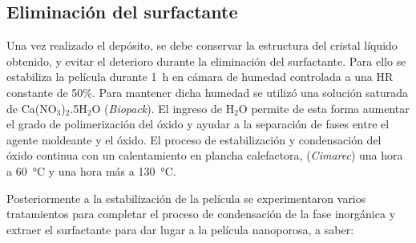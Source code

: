 	\subsection{Eliminación del surfactante}\label{sec:cond_y_extr}

		Una vez realizado el depósito, se debe conservar la estructura del cristal líquido obtenido, y evitar el deterioro durante la eliminación del surfactante. Para ello se estabiliza la película durante \SI{1}{\hour} en cámara de humedad controlada a una HR constante de 50\%. Para mantener dicha humedad se utilizó una solución saturada de Ca(NO$_3$)$_2$.5H$_2$O (\textit{Biopack}). El ingreso de H$_2$O permite de esta forma aumentar el grado de polimerización del óxido y ayudar a la separación de fases entre el agente moldeante y el óxido\cite{Crepaldi2003}. El proceso de estabilización y condensación del óxido continua con un calentamiento en plancha calefactora, (\textit{Cimarec}) una hora a \SI{60}{\celsius} y una hora más a \SI{130}{\celsius}\cite{Crepaldi2003,Crepaldi2002a}. 
				
		Posteriormente a la estabilización de la película se experimentaron varios tratamientos para completar el proceso de condensación de la fase inorgánica y extraer el surfactante para dar lugar a la película nanoporosa, a saber:

